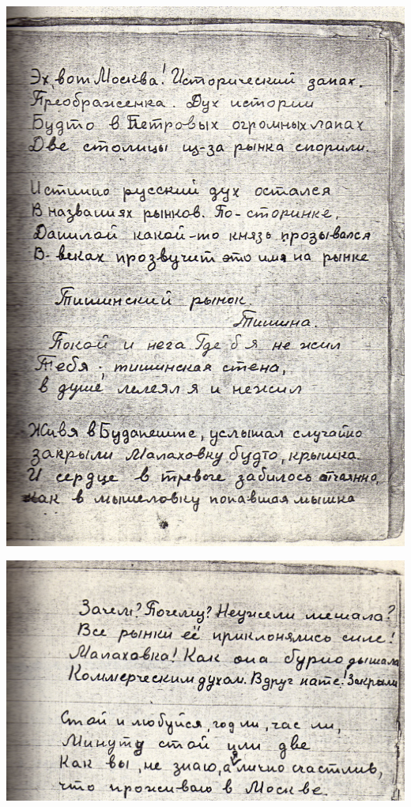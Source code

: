 \noindent
\includegraphics[width=\textwidth]{inc/Vynd/Vynd010}

\noindent
\includegraphics[width=\textwidth]{inc/Vynd/Vynd011}

\vfill

